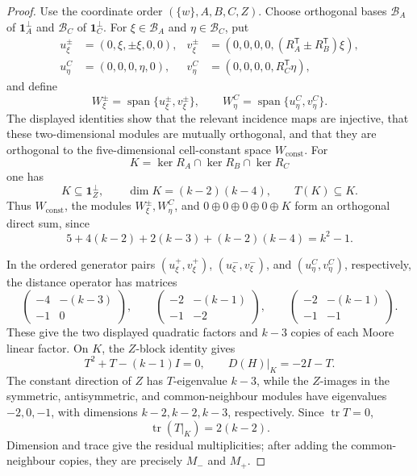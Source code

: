 \documentclass[a4paper,10pt,reqno]{amsart}
\theoremstyle{plain}
\theoremstyle{definition}
\theoremstyle{remark}
\newcommand{\one}{\mathbf 1}
\newcommand{\tr}{\operatorname{tr}}
\begin{document}
\begin{proof}
Use the coordinate order \((\{w\},A,B,C,Z)\).  Choose orthogonal bases
\(\mathcal B_A\) of \(\one_A^\perp\) and
\(\mathcal B_C\) of \(\one_C^\perp\).  For
\(\xi\in\mathcal B_A\) and \(\eta\in\mathcal B_C\), put
\[
\begin{aligned}
u_\xi^\pm&=(0,\xi,\pm\xi,0,0),&
v_\xi^\pm&=(0,0,0,0,
 (R_A^{\mathsf T}\pm R_B^{\mathsf T})\xi),\\
u_\eta^C&=(0,0,0,\eta,0),&
v_\eta^C&=(0,0,0,0,R_C^{\mathsf T}\eta),
\end{aligned}
\]
and define
\[
 W_\xi^\pm=\operatorname{span}\{u_\xi^\pm,v_\xi^\pm\},
 \qquad
 W_\eta^C=\operatorname{span}\{u_\eta^C,v_\eta^C\}.
\]
The displayed identities show that the relevant incidence maps are
injective, that these two-dimensional modules are mutually orthogonal,
and that they are orthogonal to the five-dimensional cell-constant space
\(W_{\mathrm{const}}\).  For
\[
 K=\ker R_A\cap\ker R_B\cap\ker R_C
\]
one has
\[
 K\subseteq\one_Z^\perp,\qquad
 \dim K=(k-2)(k-4),\qquad T(K)\subseteq K.
\]
Thus \(W_{\mathrm{const}}\), the modules \(W_\xi^\pm,W_\eta^C\), and
\(0\oplus0\oplus0\oplus0\oplus K\) form an orthogonal direct sum, since
\[
 5+4(k-2)+2(k-3)+(k-2)(k-4)=k^2-1.
\]

In the ordered generator pairs
\((u_\xi^+,v_\xi^+)\), \((u_\xi^-,v_\xi^-)\), and
\((u_\eta^C,v_\eta^C)\), respectively, the distance operator has matrices
\[
 \begin{pmatrix}-4&-(k-3)\\-1&0\end{pmatrix},\qquad
 \begin{pmatrix}-2&-(k-1)\\-1&-2\end{pmatrix},\qquad
 \begin{pmatrix}-2&-(k-1)\\-1&-1\end{pmatrix}.
\]
These give the two displayed quadratic factors and \(k-3\) copies of
each Moore linear factor.  On \(K\), the \(Z\)-block identity gives
\[
 T^2+T-(k-1)I=0,
 \qquad D(H)|_K=-2I-T.
\]
The constant direction of \(Z\) has \(T\)-eigenvalue \(k-3\), while the
\(Z\)-images in the symmetric, antisymmetric, and common-neighbour
modules have eigenvalues \(-2,0,-1\), with dimensions
\(k-2,k-2,k-3\), respectively.  Since \(\tr T=0\),
\[
 \tr(T|_K)=2(k-2).
\]
Dimension and trace give the residual multiplicities; after adding the
common-neighbour copies, they are precisely \(M_-\) and \(M_+\).


\end{proof}
\end{document}
